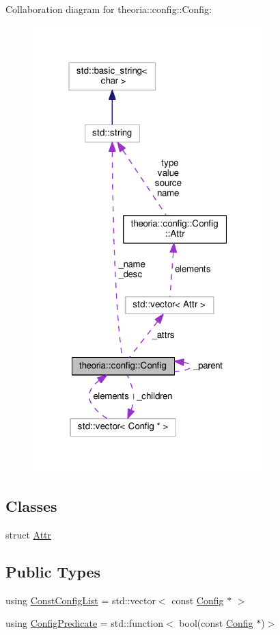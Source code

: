 Collaboration diagram for theoria\+:\+:config\+:\+:Config\+:\nopagebreak
\begin{figure}[H]
\begin{center}
\leavevmode
\includegraphics[width=253pt]{classtheoria_1_1config_1_1Config__coll__graph}
\end{center}
\end{figure}
\subsection*{Classes}
\begin{DoxyCompactItemize}
\item 
struct \hyperlink{structtheoria_1_1config_1_1Config_1_1Attr}{Attr}
\end{DoxyCompactItemize}
\subsection*{Public Types}
\begin{DoxyCompactItemize}
\item 
using \hyperlink{classtheoria_1_1config_1_1Config_a61230728ffa4d92667a536c8c0f0ca30}{Const\+Config\+List} = std\+::vector$<$ const \hyperlink{classtheoria_1_1config_1_1Config}{Config} $\ast$ $>$
\item 
using \hyperlink{classtheoria_1_1config_1_1Config_a293ebfd7146d935e232a066f7e6fa279}{Config\+Predicate} = std\+::function$<$ bool(const \hyperlink{classtheoria_1_1config_1_1Config}{Config} $\ast$)$>$
\end{DoxyCompactItemize}
